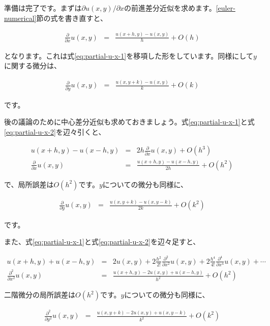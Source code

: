 準備は完了です。まずは$\partial u(x,y)/\partial x$の前進差分近似を求めます。\ref{euler-numerical}節の式を書き直すと、

\begin{eqnarray}
    \frac{\partial}{\partial x}u(x,y)&=&\frac{u(x+h,y)-u(x,y)}{h}+O(h)
\end{eqnarray}

\noindent
となります。これは式\ref{eq:partial-u-x-1}を移項した形をしています。同様にして$y$に関する微分は、

\begin{eqnarray}
    \frac{\partial}{\partial y}u(x,y)&=&\frac{u(x,y+k)-u(x,y)}{k}+O(k)
\end{eqnarray}

\noindent
です。

後の議論のために中心差分近似も求めておきましょう。式\ref{eq:partial-u-x-1}と式\ref{eq:partial-u-x-2}を辺々引くと、

\begin{eqnarray}
    u(x+h,y)-u(x-h,y)&=&2h\frac{\partial}{\partial x}u(x,y)+O(h^3) \\
    \frac{\partial}{\partial x}u(x,y)&=&\frac{u(x+h,y)-u(x-h,y)}{2h}+O(h^2)
\end{eqnarray}

\noindent
で、局所誤差は$O(h^2)$です。$y$についての微分も同様に、

\begin{eqnarray}
    \frac{\partial}{\partial y}u(x,y)&=&\frac{u(x,y+k)-u(x,y-k)}{2k}+O(k^2)
\end{eqnarray}

\noindent
です。
\fi

また、式\ref{eq:partial-u-x-1}と式\ref{eq:partial-u-x-2}を辺々足すと、

\begin{eqnarray}
    u(x+h,y)+u(x-h,y)&=&2u(x,y)+2\frac{h^2}{2!}\frac{\partial^2}{\partial x^2}u(x,y)+2\frac{h^4}{4!}\frac{\partial^4}{\partial x^4}u(x,y)+\cdots \\
    \frac{\partial^2}{\partial x^2}u(x,y)&=&\frac{u(x+h,y)-2u(x,y)+u(x-h,y)}{h^2}+O(h^2)
\end{eqnarray}

\noindent
二階微分の局所誤差は$O(h^2)$です。$y$についての微分も同様に、

\begin{eqnarray}
    \frac{\partial^2}{\partial y^2}u(x,y)&=&\frac{u(x,y+k)-2u(x,y)+u(x,y-k)}{k^2}+O(k^2)
\end{eqnarray}

